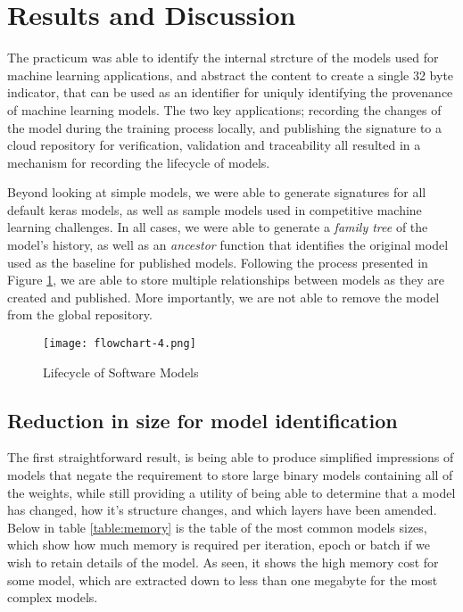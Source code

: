 \section{Results and Discussion}

The practicum was able to identify the internal strcture of the models used for machine learning applications, and abstract the content to create a single 32 byte indicator, that can be used as an identifier for  uniquly identifying the provenance of machine learning models. The two key applications; recording the changes of the model during the training process locally, and publishing the signature to a cloud repository for verification, validation and traceability all resulted in a mechanism for recording the lifecycle of models.

Beyond looking at simple models, we were able to generate signatures for all default keras models, as well as sample models used in competitive machine learning challenges. In all cases, we were able to generate a \textit{family tree} of the model's history, as well as an \textit{ancestor} function that identifies the original model used as the baseline for published models. Following the process presented in Figure \ref{fig:lifecycleModels}, we are able to store multiple relationships between models as they are created and published. More importantly, we are not able to remove the model from the global repository.

\begin{figure}[!t]
    \centering
    \texttt{[image: flowchart-4.png]}
    \caption{Lifecycle of Software Models}
    \label{fig:lifecycleModels}
\end{figure}

\subsection{Reduction in size for model identification}
The first straightforward result, is being able to produce simplified impressions of models that negate the requirement to store large binary models containing all of the weights, while still providing a utility of being able to determine that a model has changed, how it's structure changes, and which layers have been amended. Below in table \ref{table:memory} is the table of the most common models sizes, which show how much memory is required per iteration, epoch or batch if we wish to retain details of the model. As seen, it shows the high memory cost for some model, which are extracted down to less than one megabyte for the most complex models.

